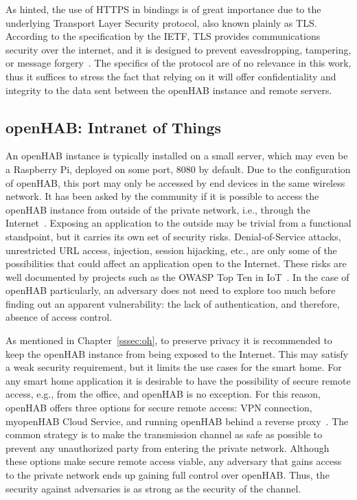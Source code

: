 \documentclass[12pt]{article}
\begin{document}
As hinted, the use of HTTPS in bindings is of great importance due to the underlying Transport Layer Security protocol, also known plainly as TLS. According to the specification by the IETF, TLS provides communications security over the internet, and it is designed to prevent eavesdropping, tampering, or message forgery~\cite{RFC5246}. The specifics of the protocol are of no relevance in this work, thus it suffices to stress the fact that relying on it will offer confidentiality and integrity to the data sent between the openHAB instance and remote servers.

\subsection{openHAB: Intranet of Things}

An openHAB instance is typically installed on a small server, which may even be a Raspberry Pi, deployed on some port, 8080 by default. Due to the configuration of openHAB, this port may only be accessed by end devices in the same wireless network. It has been asked by the community if it is possible to access the openHAB instance from outside of the private network, i.e., through the Internet~\cite{openhab_05}. Exposing an application to the outside may be trivial from a functional standpoint, but it carries its own set of security risks. Denial-of-Service attacks, unrestricted URL access, injection, session hijacking, etc., are only some of the possibilities that could affect an application open to the Internet. These risks are well documented by projects such as the OWASP Top Ten in IoT~\cite{owasp}. In the case of openHAB particularly, an adversary does not need to explore too much before finding out an apparent vulnerability: the lack of authentication, and therefore, absence of access control.

As mentioned in Chapter~\ref{sssec:oh}, to preserve privacy it is recommended to keep the openHAB instance from being exposed to the Internet. This may satisfy a weak security requirement, but it limits the use cases for the smart home. For any smart home application it is desirable to have the possibility of secure remote access, e.g., from the office, and openHAB is no exception. For this reason, openHAB offers three options for secure remote access: VPN connection, myopenHAB Cloud Service, and running openHAB behind a reverse proxy~\cite{openhab_04}. The common strategy is to make the transmission channel as safe as possible to prevent any unauthorized party from entering the private network. Although these options make secure remote access viable, any adversary that gains access to the private network ends up gaining full control over openHAB. Thus, the security against adversaries is as strong as the security of the channel.
\end{document}
